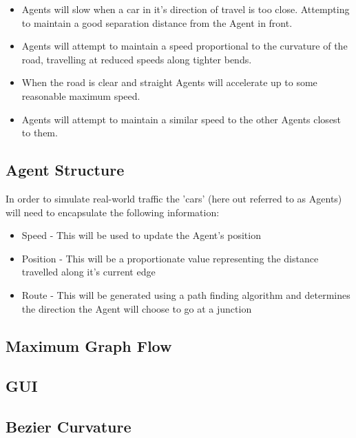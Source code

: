     \begin{itemize}
        \item Agents will slow when a car in it's direction of travel is too close. Attempting to maintain a good separation distance from the Agent in front.

        \item Agents will attempt to maintain a speed proportional to the curvature of the road, travelling at reduced speeds along tighter bends.

        \item When the road is clear and straight Agents will accelerate up to some reasonable maximum speed.

        \item Agents will attempt to maintain a similar speed to the other Agents closest to them.
    \end{itemize}

    \subsection{Agent Structure}

    In order to simulate real-world traffic the 'cars' (here out referred to as Agents) will need to encapsulate the following information:

    \begin{itemize}
        \item Speed - This will be used to update the Agent's position
        \item Position - This will be a proportionate value representing the distance travelled along it's current edge
        \item Route - This will be generated using a path finding algorithm and determines the direction the Agent will choose to go at a junction
    \end{itemize}

    \subsection{Maximum Graph Flow}

    \subsection{GUI}

    \subsection{Bezier Curvature}
